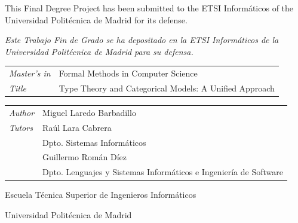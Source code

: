 \begin{titlepage}
  
  \newpage
  \thispagestyle{empty}
  
  \noindent
  This Final Degree Project has been submitted to the ETSI Informáticos of the Universidad Politécnica de Madrid for its defense.
  
  \vspace{0.5cm}
  
  \noindent
  \textit{Este Trabajo Fin de Grado se ha depositado en la ETSI Informáticos de la Universidad Politécnica de Madrid para su defensa.}
  \vspace*{4cm}

  \noindent
  \begin{tabular}{ll}
    \textit{Master's in}
    & Formal Methods in Computer Science \\
    \textit{Title}
    & Type Theory and Categorical Models: A Unified Approach
  \end{tabular}

  \vspace*{3cm}

  \noindent
  
  \vspace*{5cm}
  \noindent
  \begin{tabular}{ll}
    \textit{Author}
    & Miguel Laredo Barbadillo  \\
    \textit{Tutors}
    & Raúl Lara Cabrera  \\
    & \small{Dpto. Sistemas Informáticos} \\
    & Guillermo Román Díez \\
    & \small{Dpto. Lenguajes y Sistemas Informáticos e Ingeniería de Software} \\
  \end{tabular}

  \vspace*{1cm}

  \noindent Escuela Técnica Superior de Ingenieros Informáticos
  
  \noindent Universidad Politécnica de Madrid
  
\end{titlepage}
